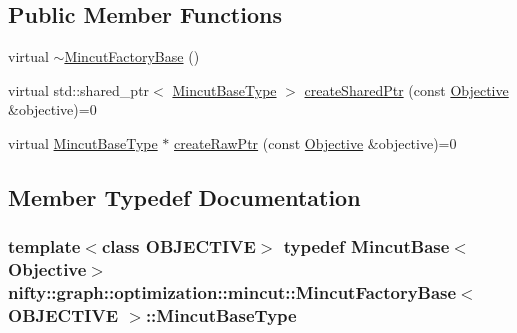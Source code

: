 \subsection*{Public Member Functions}
\begin{DoxyCompactItemize}
\item 
virtual \hyperlink{classnifty_1_1graph_1_1optimization_1_1mincut_1_1MincutFactoryBase_a24e8ea3b5ba8b421b028867d03872ba6}{$\sim$\+Mincut\+Factory\+Base} ()
\item 
virtual std\+::shared\+\_\+ptr$<$ \hyperlink{classnifty_1_1graph_1_1optimization_1_1mincut_1_1MincutFactoryBase_a42de59d331b39b682640cc9efda199a7}{Mincut\+Base\+Type} $>$ \hyperlink{classnifty_1_1graph_1_1optimization_1_1mincut_1_1MincutFactoryBase_a10a6f7a7fffcd65b351e94387a918847}{create\+Shared\+Ptr} (const \hyperlink{classnifty_1_1graph_1_1optimization_1_1mincut_1_1MincutFactoryBase_a8ee3aff3639d955ad46ddeb2836db891}{Objective} \&objective)=0
\item 
virtual \hyperlink{classnifty_1_1graph_1_1optimization_1_1mincut_1_1MincutFactoryBase_a42de59d331b39b682640cc9efda199a7}{Mincut\+Base\+Type} $\ast$ \hyperlink{classnifty_1_1graph_1_1optimization_1_1mincut_1_1MincutFactoryBase_a42af9931bce1f4c92e75e7bde90a0a68}{create\+Raw\+Ptr} (const \hyperlink{classnifty_1_1graph_1_1optimization_1_1mincut_1_1MincutFactoryBase_a8ee3aff3639d955ad46ddeb2836db891}{Objective} \&objective)=0
\end{DoxyCompactItemize}


\subsection{Member Typedef Documentation}
\hypertarget{classnifty_1_1graph_1_1optimization_1_1mincut_1_1MincutFactoryBase_a42de59d331b39b682640cc9efda199a7}{}
\subsubsection[{Mincut\+Base\+Type}]{\setlength{\rightskip}{0pt plus 5cm}template$<$class O\+B\+J\+E\+C\+T\+I\+V\+E$>$ typedef {\bf Mincut\+Base}$<${\bf Objective}$>$ {\bf nifty\+::graph\+::optimization\+::mincut\+::\+Mincut\+Factory\+Base}$<$ O\+B\+J\+E\+C\+T\+I\+V\+E $>$\+::{\bf Mincut\+Base\+Type}}\label{classnifty_1_1graph_1_1optimization_1_1mincut_1_1MincutFactoryBase_a42de59d331b39b682640cc9efda199a7}
\hypertarget{classnifty_1_1graph_1_1optimization_1_1mincut_1_1MincutFactoryBase_a8ee3aff3639d955ad46ddeb2836db891}{}
